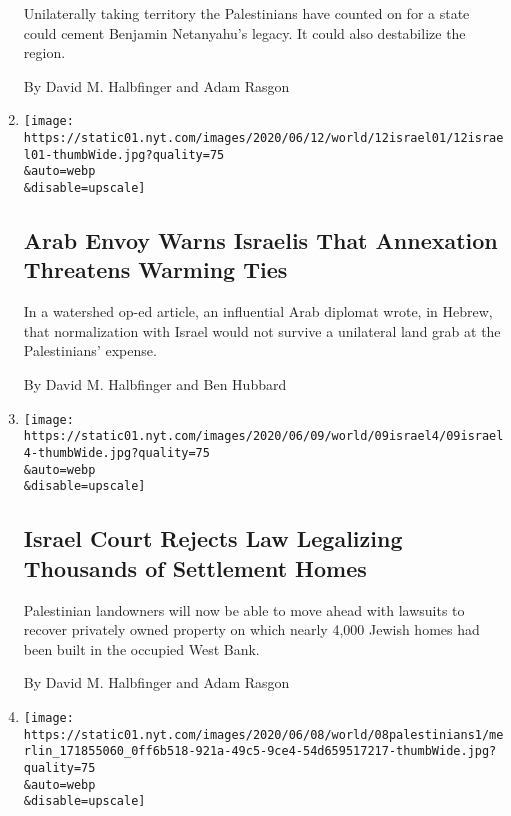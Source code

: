\begin{enumerate}
  Unilaterally taking territory the Palestinians have counted on for a
  state could cement Benjamin Netanyahu's legacy. It could also
  destabilize the region.

  By David M. Halbfinger and Adam Rasgon
\item
  \href{/2020/06/12/world/middleeast/west-bank-annexation-israel-uae.html}{}

  \texttt{[image: https://static01.nyt.com/images/2020/06/12/world/12israel01/12israel01-thumbWide.jpg?quality=75\\\&auto=webp\\\&disable=upscale]}

  \hypertarget{arab-envoy-warns-israelis-that-annexation-threatens-warming-ties}{%
  \subsection{Arab Envoy Warns Israelis That Annexation Threatens
  Warming
  Ties}\label{arab-envoy-warns-israelis-that-annexation-threatens-warming-ties}}

  In a watershed op-ed article, an influential Arab diplomat wrote, in
  Hebrew, that normalization with Israel would not survive a unilateral
  land grab at the Palestinians' expense.

  By David M. Halbfinger and Ben Hubbard
\item
  \href{/2020/06/09/world/middleeast/israel-supreme-court-west-bank-settlements.html}{}

  \texttt{[image: https://static01.nyt.com/images/2020/06/09/world/09israel4/09israel4-thumbWide.jpg?quality=75\\\&auto=webp\\\&disable=upscale]}

  \hypertarget{israel-court-rejects-law-legalizing-thousands-of-settlement-homes}{%
  \subsection{Israel Court Rejects Law Legalizing Thousands of
  Settlement
  Homes}\label{israel-court-rejects-law-legalizing-thousands-of-settlement-homes}}

  Palestinian landowners will now be able to move ahead with lawsuits to
  recover privately owned property on which nearly 4,000 Jewish homes
  had been built in the occupied West Bank.

  By David M. Halbfinger and Adam Rasgon
\item
  \href{/2020/06/08/world/middleeast/palestinian-authority-annexation-israel.html}{}

  \texttt{[image: https://static01.nyt.com/images/2020/06/08/world/08palestinians1/merlin\_171855060\_0ff6b518-921a-49c5-9ce4-54d659517217-thumbWide.jpg?quality=75\\\&auto=webp\\\&disable=upscale]}


\end{enumerate}
